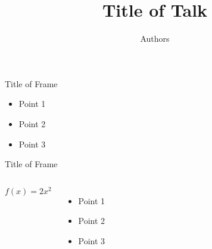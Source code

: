 \documentclass[mathserif,20pt,xcolor=table,compress,aspectratio=169]{beamer}
\title[]{Title of Talk}
\author[]{Authors}
\institute[]{Department of Mathematics, University of Houston}
\date[]{}
\begin{document}
\begin{frame}[plain,label=mytitlepage]
\titlepage
\end{frame}


\addtolength{\headsep}{-0.28cm}

\begin{frame}{Title of Frame}
\begin{itemize}
\item Point 1
\item Point 2
\item Point 3
\end{itemize}
\end{frame}


\begin{frame}{Title of Frame}
\begin{columns}
\[
f(x) = 2x^2
\]
\begin{itemize}
\item Point 1
\item Point 2
\item Point 3
\end{itemize}
\end{columns}
\end{frame}
\end{document}
